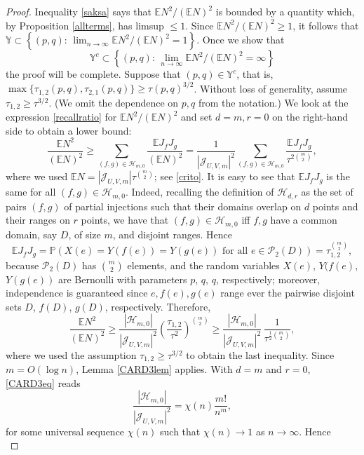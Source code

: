 \documentclass[reqno]{amsart}
\theoremstyle{theorem}
\theoremstyle{definition}
\theoremstyle{remark}
\def\P{\mathbb{P}}
\def\E{\mathbb{E}}
\def\PP{\mathscr{P}}
\def\HH{\mathscr{H}}
\newcommand{\1}{{\text{\Large $\mathfrak 1$}}}	%
\numberwithin{equation}{section}
\def\JJ{\mathscr J}
\def\Y{\mathbb{Y}}
\begin{document}
\begin{proof}
Inequality \eqref{saksa} says that $\E N^2/(\E N)^2$ is bounded by a quantity
which, by Proposition \ref{allterms},  
has limsup $\le 1$. Since $\E N^2/(\E N)^2 \ge 1$,
it follows that
$\Y \subset \left\{(p,q) : \, \lim_{n \to \infty} \E N^2/(\E N)^2 = 1\right\}$.
Once we show that
\begin{equation}
\label{Yc}
\Y^c \subset 
\left\{(p,q) : \, \lim_{n \to \infty} \E N^2/(\E N)^2 = \infty \right\}
\end{equation}
the proof will be complete.
Suppose that $(p,q) \in \Y^c$, that is, $\max\{\tau_{1,2}(p,q),
\tau_{2,1}(p,q)\} \ge \tau(p,q)^{3/2}$.
Without loss of generality, assume $\tau_{1,2}	 \ge \tau^{3/2}$.
(We omit the dependence on $p,q$ from the notation.)
We look at the expression \eqref{recallratio} for $\E N^2/(\E N)^2$
and set $d=m, r=0$ on the right-hand side to obtain a lower bound:
\[
\frac{\E N^2}{(\E N)^2} 
\ge \sum_{(f,g) \in \HH_{m,0}} \frac{ \E J_f J_g}{(\E N)^2}
= \frac{1}{|\JJ_{U,V,m}|^2} \sum_{(f,g) \in \HH_{m,0}} 
\frac{\E J_f J_g}{\tau^{2 \binom{m}{2}}},
\]
where we used $\E N = |\JJ_{U,V,m}| \tau^{\binom{m}{2}}$; see 
\eqref{crito}.
It is easy to see that $\E J_f J_g$ is the same for all $(f,g) \in \HH_{m,0}$.
Indeed, recalling the definition of $\HH_{d,r}$ as the 
set of pairs $(f,g)$ of partial injections such
that their domains overlap on $d$ points and their ranges on $r$ points,
we have that $(f,g) \in \HH_{m,0}$ iff $f, g$ have a common domain,
say $D$, of size $m$, and disjoint ranges. Hence
\[
\E J_f J_g 
= \P(X(e) = Y(f(e)) = Y(g(e)) \text{ for all } e \in \PP_2(D))
= \tau_{1,2}^{\binom{m}{2}},
\]  
because $\PP_2(D)$ has $\binom{m}{2}$ elements,
and the random variables $X(e)$, $Y(f(e)$, $Y(g(e))$
are Bernoulli with parameters $p$, $q$, $q$, respectively;
moreover, independence is guaranteed since 
$e, f(e), g(e)$ range ever the pairwise disjoint sets $D$, $f(D)$, $g(D)$,
respectively.
Therefore,
\[
\frac{\E N^2}{(\E N)^2}  
\ge \frac{|\HH_{m,0}|}{|\JJ_{U,V,m}|^2}
\left(\frac{\tau_{1,2}}{\tau^2}\right)^{\binom{m}{2}}
\ge \frac{|\HH_{m,0}|}{|\JJ_{U,V,m}|^2}\,
\frac{1}{\tau^{\frac12\binom{m}{2}}},
\]
where we used the assumption $\tau_{1,2}   \ge \tau^{3/2}$
to obtain the last inequality.
Since $m=O(\log n)$, Lemma \ref{CARD3lem} applies.
With $d=m$ and $r=0$, \eqref{CARD3eq} reads
\[
\frac{|\HH_{m,0}|}{|\JJ_{U,V,m}|^2} = \chi(n) \frac{m!}{n^m},
\]
for some universal sequence $\chi(n)$ such that $\chi(n)\to 1$
as $n \to \infty$.
Hence
\begin{equation}
\label{rlb}

\end{equation}
\end{proof}
\end{document}
